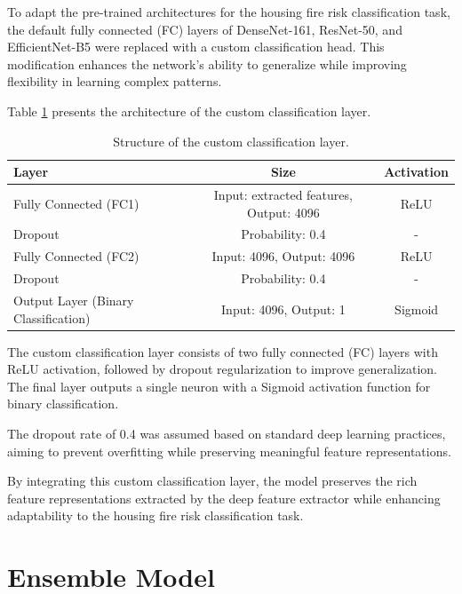 To adapt the pre-trained architectures for the housing fire risk classification task, the default 
fully connected (FC) layers of DenseNet-161, ResNet-50, and EfficientNet-B5 were 
replaced with a custom classification head. This modification enhances the network's 
ability to generalize while improving flexibility in learning complex patterns.

Table \ref{tab:classification_layer} presents the architecture 
of the custom classification layer.

\begin{table}[ht]
    \centering
    \renewcommand{\arraystretch}{1.3} %
    \setlength{\tabcolsep}{1pt} %
    \begin{tabular}{lcc}
        \toprule
        \textbf{Layer} & \textbf{Size} & \textbf{Activation} \\ 
        \midrule
        Fully Connected (FC1) & Input: extracted features, Output: 4096 & ReLU \\
        Dropout & Probability: 0.4 & - \\
        Fully Connected (FC2) & Input: 4096, Output: 4096 & ReLU \\
        Dropout & Probability: 0.4 & - \\
        Output Layer (Binary Classification) & Input: 4096, Output: 1 & Sigmoid \\
        \bottomrule
    \end{tabular}
    \caption{Structure of the custom classification layer.}
    \label{tab:classification_layer}
\end{table}

The custom classification layer consists of two fully connected (FC) layers with 
ReLU activation, followed by dropout regularization to improve generalization. 
The final layer outputs a single neuron with a Sigmoid activation function for 
binary classification.

The dropout rate of 0.4 was assumed based on standard deep learning practices, 
aiming to prevent overfitting while preserving meaningful feature representations. 

By integrating this custom classification layer, the model preserves the rich feature 
representations extracted by the deep feature extractor while enhancing adaptability 
to the housing fire risk classification task.


\section{Ensemble Model}

